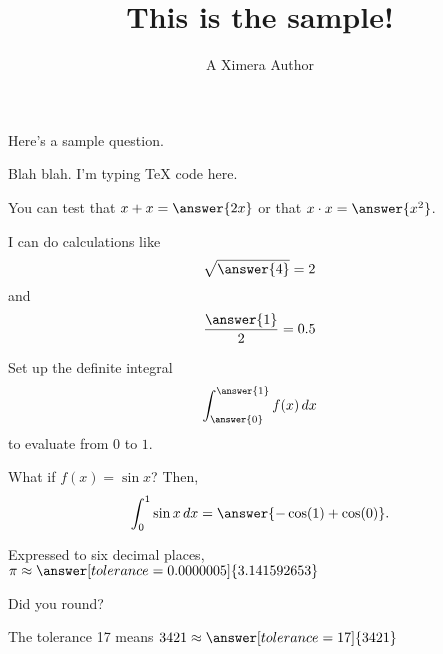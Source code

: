 \documentclass{ximera}
\title{This is the sample!}
\author{A Ximera Author}
\begin{document}
\maketitle

Here's a sample question.

\begin{problem}
\begin{multipleChoice}
\end{multipleChoice}
\end{problem}

\begin{problem}
  \begin{multipleChoice}
  \end{multipleChoice}
\end{problem}

Blah blah.  I'm typing TeX code here.

\begin{problem}
   You can test that $x + x = \answer{2x}$ or that $x \cdot x = \answer{x^2}$.

  I can do calculations like 
  \[
    \sqrt{\answer{4}} = 2
  \]
  and
  \[
    \frac{\answer{1}}{2} = 0.5
  \]
\end{problem}

\begin{problem}
  Set up the definite integral
    \[
      \int_{\answer{0}}^{\answer{1}} f(x) \, dx
    \]
    to evaluate from $0$ to $1$.

  \begin{question}
    What if $f(x) = \sin x$?  Then,
    \[
       \int_0^1 \sin x \, dx = \answer{-\cos(1) + \cos(0)}.
    \]
  \end{question}
\end{problem}

\begin{problem}
   Expressed to six decimal places,  $\pi \approx \answer[tolerance=0.0000005]{3.141592653}$
   \begin{hint}
   Did you round?
   \end{hint}
\end{problem}

\begin{problem}
   The tolerance 17 means $3421 \approx \answer[tolerance=17]{3421}$
\end{problem}
\end{document}
